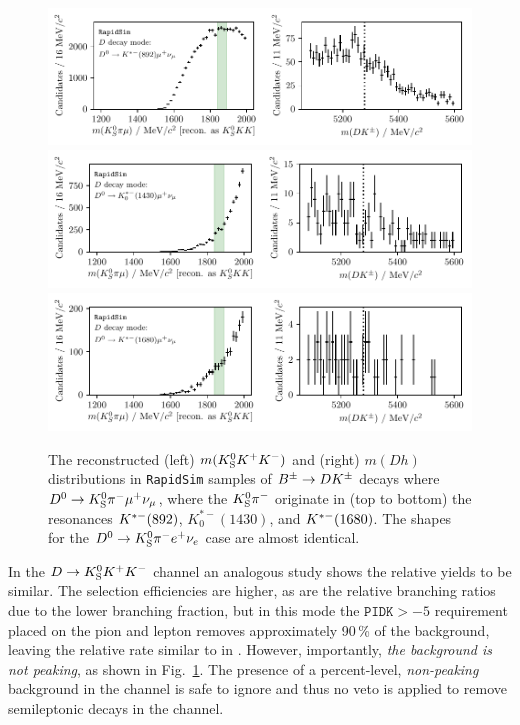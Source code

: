 \begin{figure}[tbp]
    \centering
    \includegraphics[width=0.8\columnwidth]{figures/analysis/background_checks/semilep_D_mu_892_KsKK.pdf}
    \includegraphics[width=0.8\columnwidth]{figures/analysis/background_checks/semilep_D_mu_1430_KsKK.pdf}
    \includegraphics[width=0.8\columnwidth]{figures/analysis/background_checks/semilep_D_mu_1680_KsKK.pdf}
    \caption{The reconstructed (left) $m({{K}^0_{\mathrm{S}}} K^+ K^-)$ and (right) $m(Dh)$ distributions in \texttt{RapidSim} samples of ${{B}^\pm}\rightarrow{\ensuremath{D}} {\ensuremath{{K}^\pm}}$ decays where ${{D}^0}\rightarrow{\ensuremath{{K}^0_{\mathrm{S}}}}\pi^-\mu^+\nu_\mu$, where the ${{K}^0_{\mathrm{S}}}{{\pi}^-}$ originate in (top to bottom) the resonances ${{K}^{*-}}(892)$, $K^{*-}_0(1430)$, and ${{K}^{*-}}(1680)$. The shapes for the ${{D}^0}\rightarrow{\ensuremath{{K}^0_{\mathrm{S}}}}\pi^-e^+\nu_e$ case are almost identical.}
    \label{fig:semileptonic_D_decays_kskk}
\end{figure}


In the ${D}\rightarrow{\ensuremath{{K}^0_{\mathrm{S}}}}{\ensuremath{{K}^+}}{\ensuremath{{K}^-}}$ channel an analogous study shows the relative yields to be similar. The selection efficiencies are higher, as are the relative branching ratios due to the lower \DtoKskk branching fraction, but in this mode the $\texttt{PIDK}>-5$ requirement placed on the pion and lepton removes approximately 90\,\% of the background, leaving the relative rate similar to in \DtoKspipi. However, importantly, \emph{the background is not peaking}, as shown in Fig.~\ref{fig:semileptonic_D_decays_kskk}. The presence of a percent-level, \emph{non-peaking} background in the \DtoKskk channel is safe to ignore and thus no veto is applied to remove semileptonic \D decays in the \DtoKskk channel.

